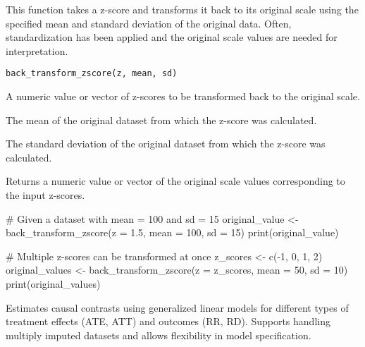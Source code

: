 \documentclass[a4paper]{book}
\begin{document}
%
\begin{Description}
This function takes a z-score and transforms it back to its original scale
using the specified mean and standard deviation of the original data. Often,
standardization has been applied and the original scale values are needed for
interpretation.
\end{Description}
%
\begin{Usage}
\begin{verbatim}
back_transform_zscore(z, mean, sd)
\end{verbatim}
\end{Usage}
%
\begin{Arguments}
\begin{ldescription}
\item[\code{z}] A numeric value or vector of z-scores to be transformed back to the original scale.

\item[\code{mean}] The mean of the original dataset from which the z-score was calculated.

\item[\code{sd}] The standard deviation of the original dataset from which the z-score was calculated.
\end{ldescription}
\end{Arguments}
%
\begin{Value}
Returns a numeric value or vector of the original scale values corresponding to the input z-scores.
\end{Value}
%
\begin{Examples}
\begin{ExampleCode}
# Given a dataset with mean = 100 and sd = 15
original_value <- back_transform_zscore(z = 1.5, mean = 100, sd = 15)
print(original_value)

# Multiple z-scores can be transformed at once
z_scores <- c(-1, 0, 1, 2)
original_values <- back_transform_zscore(z = z_scores, mean = 50, sd = 10)
print(original_values)

\end{ExampleCode}
\end{Examples}
%
\begin{Description}
Estimates causal contrasts using generalized linear models for different types of treatment effects (ATE, ATT)
and outcomes (RR, RD). Supports handling multiply imputed datasets and allows flexibility in model specification.
\end{Description}
\end{document}

